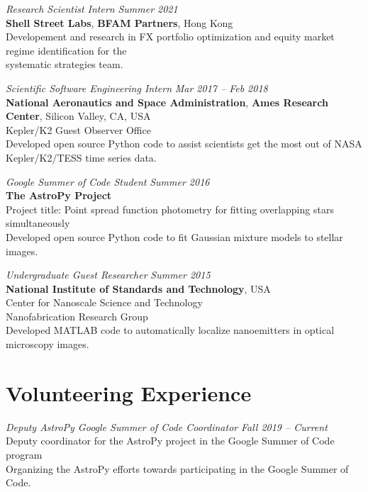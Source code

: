 \documentclass[10pt]{article}
\begin{document}
\begin{titlepage}
\emph{Research Scientist Intern} \hfill \textit{Summer 2021}
  \\\textbf{Shell Street Labs}, \textbf{BFAM Partners}, Hong Kong
  \\ {\small Developement and research in FX portfolio optimization and equity market regime identification for the}
  \\ {\small  systematic strategies team.}
\vspace{.5cm}


\emph{Scientific Software Engineering Intern} \hfill \textit{Mar 2017 -- Feb 2018}
\\\textbf{National Aeronautics and Space Administration}, \textbf{Ames Research Center}, Silicon Valley, CA, USA
\\Kepler/K2 Guest Observer Office
\\ {\small Developed open source \textsf{Python} code
    to assist scientists get the most out of NASA Kepler/K2/TESS time series data.}
\vspace{.5cm}

\emph{Google Summer of Code Student} \hfill \textit{Summer 2016}
\\\textbf{The AstroPy Project}
\\ Project title: Point spread function photometry for fitting overlapping stars simultaneously
\\ {\small Developed open source \textsf{Python} code
    to fit Gaussian mixture models to stellar images.}
\vspace{.5cm}

\emph{Undergraduate Guest Researcher} \hfill \textit{Summer 2015}
\\\textbf{National Institute of Standards and Technology}, USA
\\Center for Nanoscale Science and Technology
\\Nanofabrication Research Group
\\ {\small Developed \textsf{MATLAB} code to automatically localize nanoemitters in optical microscopy images.}


\section*{Volunteering Experience}
\emph{Deputy AstroPy Google Summer of Code Coordinator} \hfill \textit{Fall 2019 -- Current}
\\Deputy coordinator for the AstroPy project in the Google Summer of Code program
\\ {\small Organizing the AstroPy efforts towards participating in the Google Summer of Code.}
\vspace{.5cm}


\end{titlepage}
\end{document}
